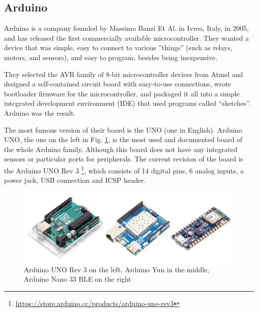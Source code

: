 		\subsection{Arduino}\label{subsec:arduino}
		
			Arduino is a company founded by Massimo Banzi Et Al. in Ivrea, Italy, in 2005, and has released the first commercially available microcontroller.
			They wanted a device that was simple, easy to connect to various ''things'' (such as relays, motors, and sensors), and easy to program, besides being inexpensive.
		
			They selected the AVR family of 8-bit microcontroller devices from Atmel and designed a self-contained circuit board with easy-to-use connections, wrote bootloader firmware for the microcontroller, and packaged it all into a simple integrated development environment (IDE) that used programs called “sketches”. 
			Arduino was the result.
			
			The most famous version of their board is the UNO (one in English).
			Arduino UNO, the one on the left in Fig. \ref{img:arduino_board}, is the most used and documented board of the whole Arduino family.
			Although this board does not have any integrated sensors or particular ports for peripherals.
			The current revision of the board is the Arduino UNO Rev 3 \footnote{\url{https://store.arduino.cc/products/arduino-uno-rev3}}, which consists of 14 digital pins, 6 analog inputs, a power jack, USB connection and ICSP header.
			
			\begin{figure}[H]
				\centering
				\includegraphics[width=\textwidth]{resources/img/chap3/arduino_types}
				\caption{Arduino UNO Rev 3 on the left, Arduino Yun in the middle, Arduino Nano 33 BLE on the right}
				\label{img:arduino_board}
			\end{figure}
			
